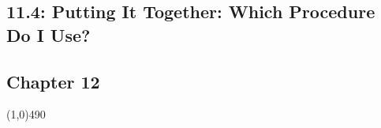 \documentclass{report}
\begin{document}
    \subsection*{11.4: Putting It Together: Which Procedure Do I Use?}
    \bigbreak \noindent 
\begin{figure}[ht]
    \centering
    \label{fig:taketwo}
\end{figure}
    
    \pagebreak \bigbreak \noindent 
    \begin{center}
        \section*{Chapter 12}
    \end{center}
    \line(1,0){490}
    \bigbreak \noindent 
\end{document}
